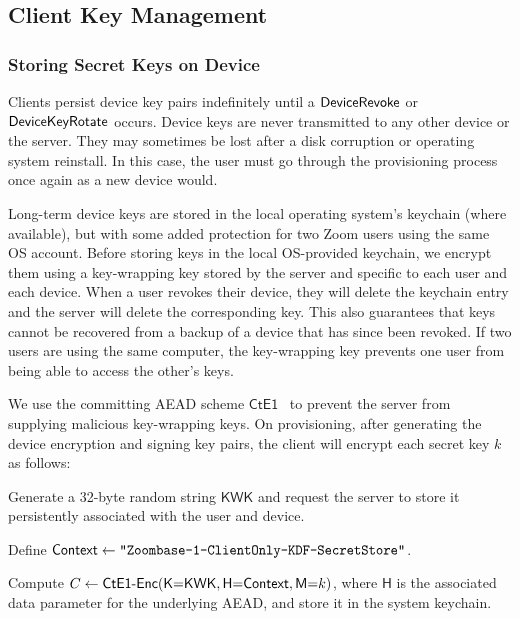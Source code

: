 

\subsection{Client Key Management}
\label{subsec:clientkeys}

\subsubsection{Storing Secret Keys on Device}
\label{subsec:lks}

Clients persist device key pairs indefinitely until a $\mathsf{DeviceRevoke}{}$ or $\mathsf{DeviceKeyRotate}{}$
occurs. Device keys are never transmitted to any other device or the server. They may sometimes be
lost after a disk corruption or operating system reinstall. In this case, the user must go through
the provisioning process once again as a new device would.

Long-term device keys are stored in the local operating system's keychain (where available), but
with some added protection for two Zoom users using the same OS account.
%
Before storing keys in the local OS-provided keychain, we encrypt them using a key-wrapping key
stored by the server and specific to each user and each device.
%
When a user revokes their device, they will delete the keychain entry and the server will delete the
corresponding key. This also guarantees that keys cannot be recovered from a backup of a device that
has since been revoked.
%
If two users are using the same computer, the key-wrapping key prevents one user from being able to
access the other's keys.

We use the committing AEAD scheme $\mathsf{CtE1}$~\cite{messagefranking} to prevent the server from
supplying malicious key-wrapping keys.
%
On provisioning, after generating the device encryption and signing key pairs, the client will
encrypt each secret key $k$ as follows:
\begingroup
\RaggedRight
\begin{enumerate*}
\item Generate a 32-byte random string $\mathsf{KWK}$ and request the server to store it
persistently associated with the user and device.
\item Define ${\sf Context} \leftarrow \texttt{"Zoombase-1-ClientOnly-KDF-SecretStore"}$.
\item Compute $C \leftarrow \textsf{CtE1-Enc}(\textsf{K}{=}\textsf{KWK}, \textsf{H}{=}{\sf Context},
\textsf{M}{=}k)$, where $\textsf{H}$ is the associated data parameter for the underlying AEAD, and
store it in the system keychain.
\end{enumerate*}
\endgroup

